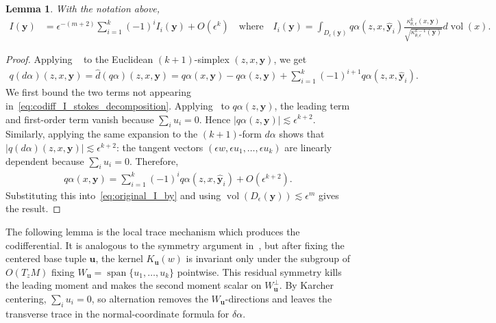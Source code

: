 \documentclass[11pt,reqno]{amsproc}
\numberwithin{equation}{section}
\newcommand{\by}{\mathbf{y}}
\newcommand{\bu}{\mathbf{u}}
\newcommand{\hd}{\hat{d}}
\newcommand{\ls}{\lesssim}
\newcommand{\vol}{\operatorname{vol}}
\newcommand{\spann}{\operatorname{span}}
\newcommand{\dvol}{d\!\vol}
\newtheorem{lemma}[counter]{Lemma}
\theoremstyle{definition}
\theoremstyle{plain}
\begin{document}
\begin{lemma} \label{lem:codiff_stokes_reduction}
    With the notation above,
    \begin{align} \label{eq:codiff_I_stokes_decomposition}
        I(\by) &= \epsilon^{-(m+2)} \sum_{i=1}^k (-1)^i I_i(\by) + O(\epsilon^k) \quad \text{where} \quad 
        I_i(\by)= 
        \int_{D_\epsilon(\by)} q\alpha(z,x,\hat{\by}_i) \frac{\kappa_{\theta,\epsilon}^k(x,\by)}{\sqrt{\kappa_{\theta,\epsilon}^{k-1}(\by)}} \dvol(x).
    \end{align}
\end{lemma}
\begin{proof}
    Applying ~ to the Euclidean $(k+1)$-simplex $(z,x,\by)$, we get
    \begin{align} \label{eq:first_stokes}
        q(d\alpha)(z, x, \by) = \hd (q\alpha)(z,x,\by) = q\alpha(x, \by) - q\alpha(z, \by) + \sum_{i=1}^k (-1)^{i+1} q\alpha(z, x, \hat{\by}_i).
    \end{align}
    We first bound the two terms not appearing in~\eqref{eq:codiff_I_stokes_decomposition}. Applying~ to $q\alpha(z,\by)$, the leading term and first-order term vanish because $\sum_i u_i=0$. Hence $|q\alpha(z,\by)|\ls \epsilon^{k+2}$. Similarly, applying the same expansion to the $(k+1)$-form $d\alpha$ shows that $|q(d\alpha)(z,x,\by)|\ls \epsilon^{k+2}$: the tangent vectors $(\epsilon w,\epsilon u_1,\ldots,
    \epsilon u_k)$ are linearly dependent because $\sum_i u_i=0$. Therefore,
    \begin{align}
        q\alpha(x,\by)=\sum_{i=1}^k (-1)^i q\alpha(z,x,\hat{\by}_i)+O(\epsilon^{k+2}).
    \end{align}
    Substituting this into~\eqref{eq:original_I_by} and using $\vol(D_\epsilon(\by))\ls \epsilon^m$ gives the result.
\end{proof}



The following lemma is the local trace mechanism which produces the codifferential. It is analogous to the symmetry argument in~, but after fixing the centered base tuple $\bu$, the kernel $K_\bu(w)$ is invariant only under the subgroup of $O(T_zM)$ fixing $W_\bu=\spann\{u_1,\ldots,u_k\}$ pointwise. This residual symmetry kills the leading moment and makes the second moment scalar on $W_\bu^\perp$. By Karcher centering, $\sum_i u_i=0$, so alternation removes the $W_\bu$-directions and leaves the transverse trace in the normal-coordinate formula for $\delta\alpha$.
\end{document}
